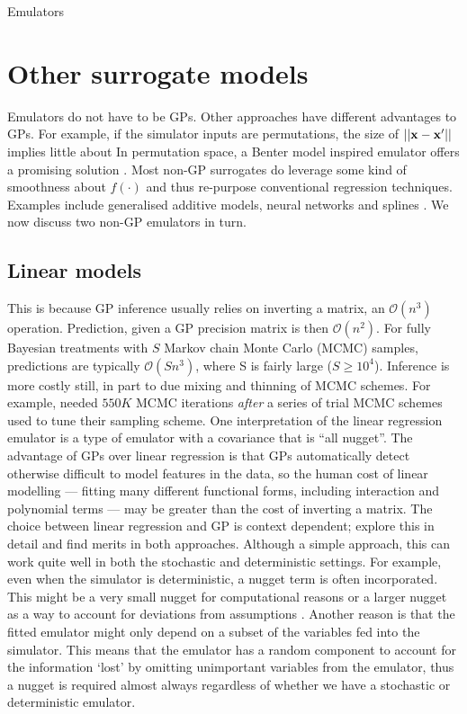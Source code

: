 \begin{chapter}{Emulators \label{Ch:Emulators}}
\section{Other surrogate models}
Emulators do not have to be GPs. Other approaches have different advantages to GPs. For example, if the simulator inputs are permutations, the size of $||\mathbf{x} - \mathbf{x}'||$ implies little about  In permutation space, a Benter model inspired emulator offers a promising solution \citep{Wilson2018}. Most non-GP surrogates do leverage some kind of smoothness about $f(\cdot)$ and thus re-purpose conventional regression techniques. Examples include generalised additive models, neural networks and splines \citep{Marrel2012, Tripathy2018, Barton2006}. We now discuss two non-GP emulators in turn.
\subsection{Linear models}
 This is because GP inference usually relies on inverting a matrix, an $\mathcal{O}(n^3)$ operation. Prediction, given a GP precision matrix is then $\mathcal{O}(n^2)$. For fully Bayesian treatments with $S$ Markov chain Monte Carlo (MCMC) samples, predictions are typically $\mathcal{O}(S n^3)$, where S is fairly large ($S \geq 10^4$). Inference is more costly still, in part to due mixing and thinning of MCMC schemes. For example, \citet{Baggaley2012} needed $550K$ MCMC iterations \textit{after} a series of trial MCMC schemes used to tune their sampling scheme.  One interpretation of the linear regression emulator is a type of emulator with a covariance that is ``all nugget''. The advantage of GPs over linear regression is that GPs automatically detect otherwise difficult to model features in the data, so the human cost of linear modelling --- fitting many different functional forms, including interaction and polynomial terms --- may be greater than the cost of inverting a matrix. The choice between linear regression and GP is context dependent; \citet{Salter2016} explore this in detail and find merits in both approaches.
Although a simple approach, this can work quite well in both the stochastic and deterministic settings. For example, even when the simulator is deterministic, a nugget term is often incorporated. This might be a very small nugget for computational reasons or a larger nugget as a way to account for deviations from assumptions \citep{Gramacy12}. Another reason is that the fitted emulator might only depend on a subset of the variables fed into the simulator. This means that the emulator has a random component to account for the information `lost' by omitting unimportant variables from the emulator, thus a nugget is required almost always regardless of whether we have a stochastic or deterministic emulator.

\end{chapter}
